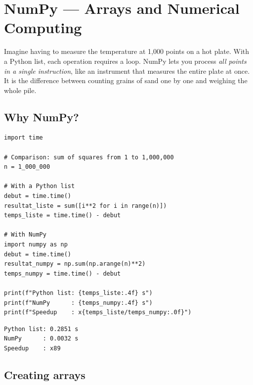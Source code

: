 \chapter{NumPy --- Arrays and Numerical Computing}
\label{ch:numpy}

\begin{intuition}
Imagine having to measure the temperature at 1,000 points on a hot plate.
With a Python list, each operation requires a loop. NumPy
lets you process \emph{all points in a single instruction}, like an instrument
that measures the entire plate at once. It is the difference between counting
grains of sand one by one and weighing the whole pile.
\end{intuition}

\section{Why NumPy?}

\begin{codeblock}[title=\textbf{Python}]
\begin{verbatim}
import time

# Comparison: sum of squares from 1 to 1,000,000
n = 1_000_000

# With a Python list
debut = time.time()
resultat_liste = sum([i**2 for i in range(n)])
temps_liste = time.time() - debut

# With NumPy
import numpy as np
debut = time.time()
resultat_numpy = np.sum(np.arange(n)**2)
temps_numpy = time.time() - debut

print(f"Python list: {temps_liste:.4f} s")
print(f"NumPy      : {temps_numpy:.4f} s")
print(f"Speedup    : x{temps_liste/temps_numpy:.0f}")
\end{verbatim}
\end{codeblock}

\begin{codeoutput}
\begin{verbatim}
Python list: 0.2851 s
NumPy      : 0.0032 s
Speedup    : x89
\end{verbatim}
\end{codeoutput}

\section{Creating arrays}


